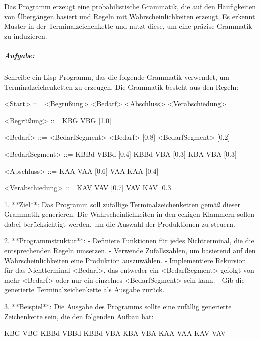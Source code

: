 \documentclass[
]{article}
\begin{document}
Das Programm erzeugt eine probabilistische Grammatik, die auf den
Häufigkeiten von Übergängen basiert und Regeln mit Wahrscheinlichkeiten
erzeugt. Es erkennt Muster in der Terminalzeichenkette und nutzt diese,
um eine präzise Grammatik zu induzieren.

\subparagraph{\texorpdfstring{\textbf{Aufgabe:}}{Aufgabe:}}\label{aufgabe-4}

Schreibe ein Lisp-Programm, das die folgende Grammatik verwendet, um
Terminalzeichenketten zu erzeugen. Die Grammatik besteht aus den Regeln:

\textless Start\textgreater{} ::= \textless Begrüßung\textgreater{}
\textless Bedarf\textgreater{} \textless Abschluss\textgreater{}
\textless Verabschiedung\textgreater{}

\textless Begrüßung\textgreater{} ::= KBG VBG {[}1.0{]}

\textless Bedarf\textgreater{} ::= \textless BedarfSegment\textgreater{}
\textless Bedarf\textgreater{} {[}0.8{]} \textbar{}
\textless BedarfSegment\textgreater{} {[}0.2{]}

\textless BedarfSegment\textgreater{} ::= KBBd VBBd {[}0.4{]} \textbar{}
KBBd VBA {[}0.3{]} \textbar{} KBA VBA {[}0.3{]}

\textless Abschluss\textgreater{} ::= KAA VAA {[}0.6{]} \textbar{} VAA
KAA {[}0.4{]}

\textless Verabschiedung\textgreater{} ::= KAV VAV {[}0.7{]} \textbar{}
VAV KAV {[}0.3{]}

1. **Ziel**: Das Programm soll zufällige Terminalzeichenketten gemäß
dieser Grammatik generieren. Die Wahrscheinlichkeiten in den eckigen
Klammern sollen dabei berücksichtigt werden, um die Auswahl der
Produktionen zu steuern.

2. **Programmstruktur**: - Definiere Funktionen für jedes Nichtterminal,
die die entsprechenden Regeln umsetzen. - Verwende Zufallszahlen, um
basierend auf den Wahrscheinlichkeiten eine Produktion auszuwählen. -
Implementiere Rekursion für das Nichtterminal
\textless Bedarf\textgreater, das entweder ein
\textless BedarfSegment\textgreater{} gefolgt von mehr
\textless Bedarf\textgreater{} oder nur ein einzelnes
\textless BedarfSegment\textgreater{} sein kann. - Gib die generierte
Terminalzeichenkette als Ausgabe zurück.

3. **Beispiel**: Die Ausgabe des Programms sollte eine zufällig
generierte Zeichenkette sein, die den folgenden Aufbau hat:

KBG VBG KBBd VBBd KBBd VBA KBA VBA KAA VAA KAV VAV
\end{document}
